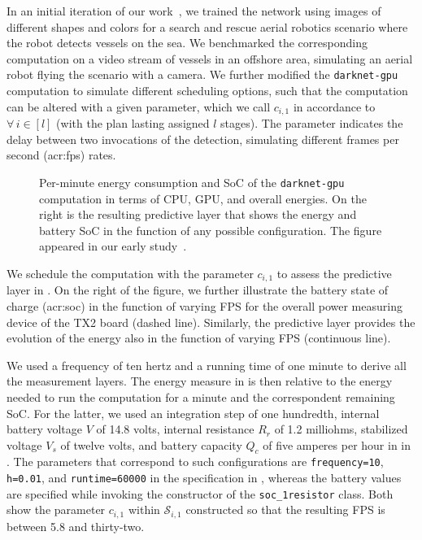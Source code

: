 In an initial iteration of our work~\citep{teamplayd43}, we trained the network using images of different shapes and colors for a search and rescue aerial robotics scenario where the robot detects vessels on the sea. We benchmarked the corresponding computation on a video stream of vessels in an offshore area, simulating an aerial robot flying the scenario with a camera. We further modified the {\small\tt darknet-gpu} computation to simulate different scheduling options, such that the computation can be altered with a given parameter, which we call $c_{i,1}$ in accordance to  $\forall\,i\in[l]$  (with the plan lasting assigned $l$ stages). The parameter indicates the delay between two invocations of the detection, simulating different frames per second (\Gls{acr:fps}) rates. 
\begin{figure}[h!]
  \centering
  \selectfont
  
  \sfr
  \caption[Per-minute energy consumption and SoC of the object detection computation]{Per-minute energy consumption and SoC of the {\tt darknet-gpu} computation in terms of CPU, GPU, and overall energies. On the right is the resulting predictive layer that shows the energy and battery SoC in the function of any possible configuration. The figure appeared in our early study~\citep{seewald2019coarse}.}
  \label{fig:darknet-layer2}
  \efr
\end{figure}
We schedule the computation with the parameter $c_{i,1}$ to assess the predictive layer in . On the right of the figure, we further illustrate the battery state of charge (\Gls{acr:soc}) in the function of varying FPS for the overall power measuring device of the TX2 board (dashed line). Similarly, the predictive layer provides the evolution of the energy also in the function of varying FPS (continuous line).

We used a frequency of ten hertz and a running time of one minute to derive all the measurement layers. The energy measure in  is then relative to the energy needed to run the computation for a minute and the correspondent remaining SoC. For the latter, we used an integration step of one hundredth, internal battery voltage $V$ of 14.8 volts, internal resistance $R_r$ of 1.2 milliohms, stabilized voltage $V_s$ of twelve volts, and battery capacity $Q_c$ of five amperes per hour in  in . The parameters that correspond to such configurations are {\small\tt frequency=10}, {\small\tt h=0.01}, and {\small\tt runtime=60000} in the specification in , whereas the battery values are specified while invoking the constructor of the {\small\tt soc\_1resistor} class. Both  show the parameter $c_{i,1}$ within $\mathcal{S}_{i,1}$ constructed so that the resulting FPS is between 5.8 and thirty-two.

